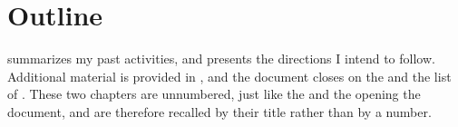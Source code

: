 \section[introduction_outline]{Outline}

 summarizes my past activities, and  presents the directions I intend to follow.
Additional material is provided in , and the document closes on the  and the list of .
These two chapters are unnumbered, just like the  and the  opening the document, and are therefore recalled by their title rather than by a number.

